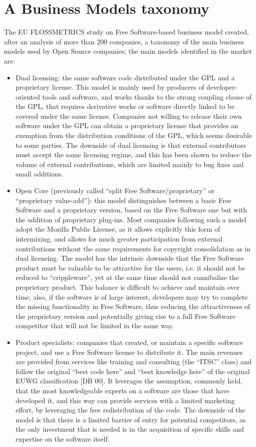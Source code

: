 \section*{A Business Models taxonomy}

The EU FLOSSMETRICS study on Free Software-based business model created, after an analysis of more than 200 companies, a taxonomy of the main business models used by Open Source companies; the main models identified in the market are: 
\begin{itemize}
 \item Dual licensing: the same software code distributed under the GPL and a proprietary license. This model is mainly used by producers of developer-oriented tools and software, and works thanks to the strong coupling clause of the GPL, that requires derivative works or software directly linked to be covered under the same license. Companies not willing to release their own software under the GPL can obtain a proprietary license that provides an exemption from the distribution conditions of the GPL, which seems desirable to some parties. The downside of dual licensing is that external contributors must accept the same licensing regime, and this has been shown to reduce the volume of external contributions, which are limited mainly to bug fixes and small additions.
 \item Open Core (previously called “split Free Software/proprietary” or “proprietary value-add”): this model distinguishes between a basic Free Software and a proprietary version, based on the Free Software one but with the addition of proprietary plug-ins. Most companies following such a model adopt the Mozilla Public License, as it allows explicitly this form of intermixing, and allows for much greater participation from external contributions without the same requirements for copyright consolidation as in dual licensing. The model has the intrinsic downside that the Free Software product must be valuable to be attractive for the users, i.e. it should not be reduced to “crippleware”, yet at the same time should not cannibalize the proprietary product. This balance is difficult to achieve and maintain over time; also, if the software is of large interest, developers may try to complete the missing functionality in Free Software, thus reducing the attractiveness of the proprietary version and potentially giving rise to a full Free Software competitor that will not be limited in the same way.
 \item Product specialists: companies that created, or maintain a specific software project, and use a Free Software license to distribute it. The main revenues are provided from services like training and consulting (the “ITSC” class) and follow the original “best code here” and “best knowledge here” of the original EUWG classification [DB 00]. It leverages the assumption, commonly held, that the most knowledgeable experts on a software are those that have developed it, and this way can provide services with a limited marketing effort, by leveraging the free redistribution of the code. The downside of the model is that there is a limited barrier of entry for potential competitors, as the only investment that is needed is in the acquisition of specific skills and expertise on the software itself.

\end{itemize}
